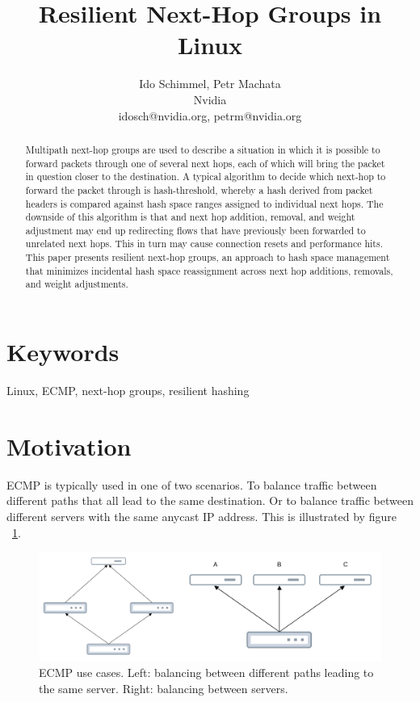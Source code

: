 \documentclass[letterpaper]{article}
\title{Resilient Next-Hop Groups in Linux}
\author{Ido Schimmel, Petr Machata\\
Nvidia\\
idosch@nvidia.org, petrm@nvidia.org\\
\newline
\newline
}
\begin{document}
\maketitle
\begin{abstract}
Multipath next-hop groups are used to describe a situation in which it is
possible to forward packets through one of several next hops, each of which
will bring the packet in question closer to the destination. A typical
algorithm to decide which next-hop to forward the packet through is
hash-threshold, whereby a hash derived from packet headers is compared
against hash space ranges assigned to individual next hops. The downside of
this algorithm is that and next hop addition, removal, and weight
adjustment may end up redirecting flows that have previously been forwarded
to unrelated next hops. This in turn may cause connection resets and
performance hits. This paper presents resilient next-hop groups, an
approach to hash space management that minimizes incidental hash space
reassignment across next hop additions, removals, and weight adjustments.
\end{abstract}

\section{Keywords}
Linux, ECMP, next-hop groups, resilient hashing

\section{Motivation}

ECMP is typically used in one of two scenarios. To balance traffic between
different paths that all lead to the same destination. Or to balance
traffic between different servers with the same anycast IP address. This is
illustrated by figure ~\ref{fig:ECMP}.

\begin{figure}[h]
\includegraphics[width=\textwidth]{ECMP.png}
\caption{ECMP use cases. Left: balancing between different paths leading to
  the same server. Right: balancing between servers.}
\label{fig:ECMP}
\end{figure}
\end{document}

